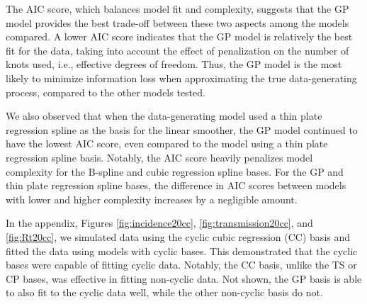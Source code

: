 \documentclass[
11pt, %
oneside, %
english, %
singlespacing, %
]{macthesis} %
\begin{document}
The AIC score, which balances model fit and complexity, suggests that the GP model provides the best trade-off between these two aspects among the models compared. A lower AIC score indicates that the GP model is relatively the best fit for the data, taking into account the effect of penalization on the number of knots used, i.e., effective degrees of freedom. Thus, the GP model is the most likely to minimize information loss when approximating the true data-generating process, compared to the other models tested.

We also observed that when the data-generating model used a thin plate regression spline as the basis for the linear smoother, the GP model continued to have the lowest AIC score, even compared to the model using a thin plate regression spline basis. Notably, the AIC score heavily penalizes model complexity for the B-spline and cubic regression spline bases. For the GP and thin plate regression spline bases, the difference in AIC scores between models with lower and higher complexity increases by a negligible amount.

In the appendix, Figures \ref{fig:incidence20cc}, \ref{fig:transmission20cc}, and \ref{fig:Rt20cc}, we simulated data using the cyclic cubic regression (CC) basis and fitted the data using models with cyclic bases. This demonstrated that the cyclic bases were capable of fitting cyclic data. Notably, the CC basis, unlike the TS or CP bases, was effective in fitting non-cyclic data. Not shown, the GP basis is able to also fit to the cyclic data well, while the other non-cyclic basis do not.
\end{document}
